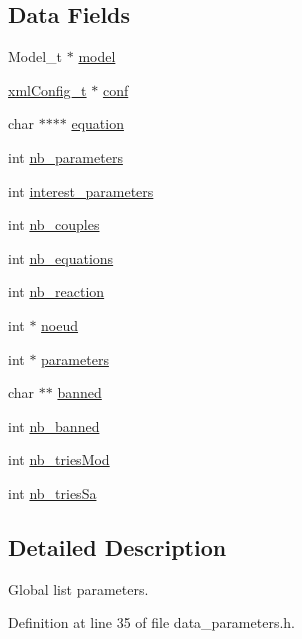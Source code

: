 \subsection*{Data Fields}
\begin{DoxyCompactItemize}
\item 
Model\_\-t $\ast$ \hyperlink{structListParameters_ad167c56ffa16ae7c55245c7c683bbc1c}{model}
\item 
\hyperlink{structxmlConfig__t}{xmlConfig\_\-t} $\ast$ \hyperlink{structListParameters_a96adc4ee0346b24efd2139d3768be76e}{conf}
\item 
char $\ast$$\ast$$\ast$$\ast$ \hyperlink{structListParameters_a1d99e34efe708f0a4dee5f5de7a50c6c}{equation}
\item 
int \hyperlink{structListParameters_a079cdc6651256ac5ee10e546fc01ebba}{nb\_\-parameters}
\item 
int \hyperlink{structListParameters_ae9a1f821ed712556e68fe4d2d91ca1a0}{interest\_\-parameters}
\item 
int \hyperlink{structListParameters_a78464fa8003787f72be81b561fcd141a}{nb\_\-couples}
\item 
int \hyperlink{structListParameters_a45a3376021fb8e41738aa3452d7c0dbb}{nb\_\-equations}
\item 
int \hyperlink{structListParameters_a1bd4ac749f2642216552aa20a2305727}{nb\_\-reaction}
\item 
int $\ast$ \hyperlink{structListParameters_a1c994d58b286eb0b71a966c1bf079c65}{noeud}
\item 
int $\ast$ \hyperlink{structListParameters_a20e9f07e2dc0f0024591b185bd126cb0}{parameters}
\item 
char $\ast$$\ast$ \hyperlink{structListParameters_ab0d2940b00e8d0d8ae31606f79ce6373}{banned}
\item 
int \hyperlink{structListParameters_aae885063019b7630081d14786e3b48e9}{nb\_\-banned}
\item 
int \hyperlink{structListParameters_a43227ba7fdca24b48e08a561d2c417b3}{nb\_\-triesMod}
\item 
int \hyperlink{structListParameters_afb96e3b0b020bfb8d52448fac7447d3a}{nb\_\-triesSa}
\end{DoxyCompactItemize}


\subsection{Detailed Description}
Global list parameters. 

Definition at line 35 of file data\_\-parameters.h.



